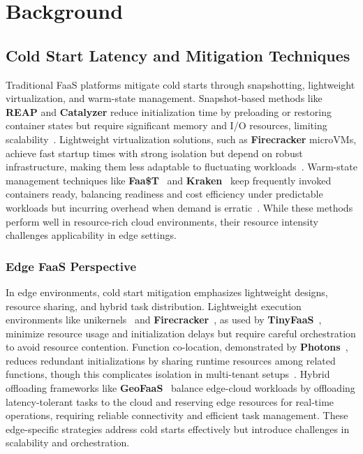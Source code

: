\section{Background}\label{sec:backgrnd}

\subsection{Cold Start Latency and Mitigation Techniques}

Traditional FaaS platforms mitigate cold starts through snapshotting, lightweight virtualization, and warm-state management. Snapshot-based methods like \textbf{REAP} and \textbf{Catalyzer} reduce initialization time by preloading or restoring container states but require significant memory and I/O resources, limiting scalability~\cite{dong_catalyzer_2020, ustiugov_benchmarking_2021}. Lightweight virtualization solutions, such as \textbf{Firecracker} microVMs, achieve fast startup times with strong isolation but depend on robust infrastructure, making them less adaptable to fluctuating workloads~\cite{agache_firecracker_2020}. Warm-state management techniques like \textbf{Faa\$T}~\cite{romero_faa_2021} and \textbf{Kraken}~\cite{vivek_kraken_2021} keep frequently invoked containers ready, balancing readiness and cost efficiency under predictable workloads but incurring overhead when demand is erratic~\cite{romero_faa_2021, vivek_kraken_2021}. While these methods perform well in resource-rich cloud environments, their resource intensity challenges applicability in edge settings.

\subsubsection{Edge FaaS Perspective}

In edge environments, cold start mitigation emphasizes lightweight designs, resource sharing, and hybrid task distribution. Lightweight execution environments like unikernels~\cite{edward_sock_2018} and \textbf{Firecracker}~\cite{agache_firecracker_2020}, as used by \textbf{TinyFaaS}~\cite{pfandzelter_tinyfaas_2020}, minimize resource usage and initialization delays but require careful orchestration to avoid resource contention. Function co-location, demonstrated by \textbf{Photons}~\cite{v_dukic_photons_2020}, reduces redundant initializations by sharing runtime resources among related functions, though this complicates isolation in multi-tenant setups~\cite{v_dukic_photons_2020}. Hybrid offloading frameworks like \textbf{GeoFaaS}~\cite{malekabbasi_geofaas_2024} balance edge-cloud workloads by offloading latency-tolerant tasks to the cloud and reserving edge resources for real-time operations, requiring reliable connectivity and efficient task management. These edge-specific strategies address cold starts effectively but introduce challenges in scalability and orchestration.

